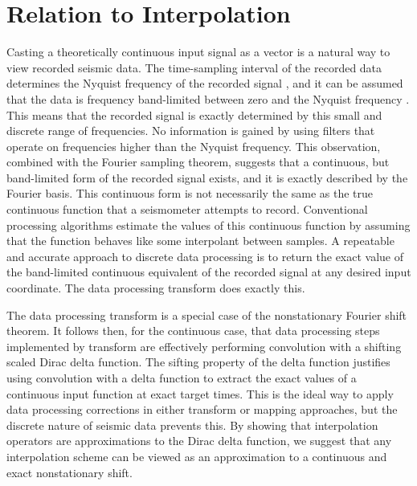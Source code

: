 \section{Relation to Interpolation}
Casting a theoretically continuous input signal as a vector is a natural way to view recorded seismic data.
The time-sampling interval of the recorded data determines the Nyquist frequency of the recorded signal \cite{gubbins04}, and it can be assumed that the data is frequency band-limited between zero and the Nyquist frequency \cite{gubbins04}.
This means that the recorded signal is exactly determined by this small and discrete range of frequencies.
No information is gained by using filters that operate on frequencies higher than the Nyquist frequency.
This observation, combined with the Fourier sampling theorem, suggests that a continuous, but band-limited form of the recorded signal exists, and it is exactly described by the Fourier basis.
This continuous form is not necessarily the same as the true continuous function that a seismometer attempts to record.
Conventional processing algorithms estimate the values of this continuous function by assuming that the function behaves like some interpolant between samples.
A repeatable and accurate approach to discrete data processing is to return the exact value of the band-limited continuous equivalent of the recorded signal at any desired input coordinate.
The data processing transform does exactly this.

The data processing transform is a special case of the nonstationary Fourier shift theorem.
It follows then, for the continuous case, that data processing steps implemented by transform are effectively performing convolution with a shifting scaled Dirac delta function.
The sifting property of the delta function justifies using convolution with a delta function to extract the exact values of a continuous input function at exact target times.
This is the ideal way to apply data processing corrections in either transform or mapping approaches, but the discrete nature of seismic data prevents this.
By showing that interpolation operators are approximations to the Dirac delta function, we suggest that any interpolation scheme can be viewed as an approximation to a continuous and exact nonstationary shift.

